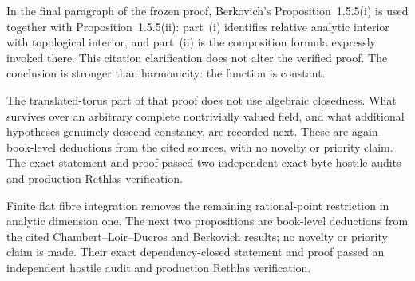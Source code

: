 In the final paragraph of the frozen proof, Berkovich's
Proposition~1.5.5(i) is used together with Proposition~1.5.5(ii): part~(i)
identifies relative analytic interior with topological interior, and part~(ii)
is the composition formula expressly invoked there.  This citation
clarification does not alter the verified proof.  The conclusion is stronger
than harmonicity: the function is constant.

The translated-torus part of that proof does not use algebraic closedness.
What survives over an arbitrary complete nontrivially valued field, and what
additional hypotheses genuinely descend constancy, are recorded next.  These
are again book-level deductions from the cited sources, with no novelty or
priority claim.  The exact statement and proof passed two independent
exact-byte hostile audits and production Rethlas verification.

\begingroup
\providecommand{\an}{\mathrm{an}}


\begingroup
\makeatletter
\let\pzerosixtwodescent@original@nonumberplain\th@nonumberplain
\def\th@nonumberplain{%
  \pzerosixtwodescent@original@nonumberplain
  \def\@opargbegintheorem##1##2##3{%
    \item[\theorem@headerfont\hskip\labelsep ##3\theorem@separator]}}
\makeatother

\endgroup
\endgroup

Finite flat fibre integration removes the remaining rational-point
restriction in analytic dimension one.  The next two propositions are
book-level deductions from the cited Chambert--Loir--Ducros and Berkovich
results; no novelty or priority claim is made.  Their exact
dependency-closed statement and proof passed an independent hostile audit
and production Rethlas verification.

\begingroup
\providecommand{\an}{\mathrm{an}}


\begingroup
\makeatletter
\let\pzerosixtwocurve@original@nonumberplain\th@nonumberplain
\def\th@nonumberplain{%
  \pzerosixtwocurve@original@nonumberplain
  \def\@opargbegintheorem##1##2##3{%
    \item[\theorem@headerfont\hskip\labelsep ##3\theorem@separator]}}
\makeatother

\endgroup
\endgroup

